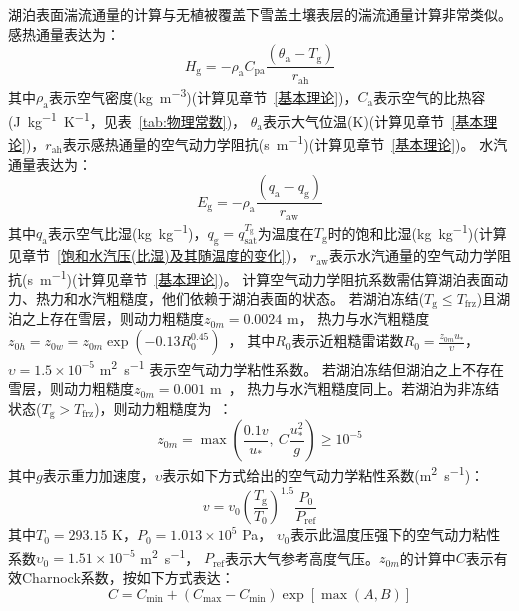 湖泊表面湍流通量的计算与无植被覆盖下雪盖土壤表层的湍流通量计算非常类似。感热通量表达为：
\begin{equation}
  H_{\mathrm{g}}=-\rho_{\mathrm{a}} C_{\mathrm{p a}} \frac{\left(\theta_{\mathrm{a}}-T_{\mathrm{g}}\right)}{r_{\mathrm{a h}}}
\end{equation}
其中$\rho_{\mathrm{a}}$表示空气密度(\unit{kg.m^{-3}})(计算见章节~\ref{基本理论})，$C_{\mathrm{a}}$表示空气的比热容(\unit{J.kg^{-1}.K^{-1}}，见表~\ref{tab:物理常数})，
$\theta_{\mathrm{a}}$表示大气位温(K)(计算见章节~\ref{基本理论})，$r_{\mathrm{ah}}$表示感热通量的空气动力学阻抗(\unit{s.m^{-1}})(计算见章节~\ref{基本理论})。
水汽通量表达为：
\begin{equation}
  E_{\mathrm{g}}=-\rho_{\mathrm{a}} \frac{\left(q_{\mathrm{a}}-q_{\mathrm{g}}\right)}{r_{\mathrm{a w}}}
\end{equation}
其中$q_{\mathrm{a}}$表示空气比湿(\unit{kg.kg^{-1}})，$q_{\mathrm {g}} =q_{\mathrm{sat}}^{T_{\mathrm {g}} }$为温度在$T_{\mathrm {g}} $时的饱和比湿(\unit{kg.kg^{-1}})(计算见章节~\ref{饱和水汽压(比湿)及其随温度的变化})，
$r_{\mathrm{aw}}$表示水汽通量的空气动力学阻抗(\unit{s.m^{-1}})(计算见章节~\ref{基本理论})。
计算空气动力学阻抗系数需估算湖泊表面动力、热力和水汽粗糙度，他们依赖于湖泊表面的状态。
若湖泊冻结($T_{\mathrm {g}} \leqslant T_{\mathrm {frz}} $)且湖泊之上存在雪层，则动力粗糙度$z_{0m}=0.0024$ m，
热力与水汽粗糙度$z_{0h}=z_{0w}=z_{0m}\exp{\left(-0.13R_0^{0.45}\right)}$~\citep{zilitinkevich1972dynamics}，
其中$R_0$表示近粗糙雷诺数$R_0=\frac{z_{0m}u_\ast}{\upsilon}$，
$\upsilon=1.5\times{10}^{-5}$ \unit{m^2.s^{-1}} 表示空气动力学粘性系数。
若湖泊冻结但湖泊之上不存在雪层，则动力粗糙度$z_{0m}=0.001$ m~\citep{subin2012improved}，
热力与水汽粗糙度同上。若湖泊为非冻结状态($T_{\mathrm {g}} >T_{\mathrm {frz}} $)，则动力粗糙度为~\citep{subin2012improved}：
\begin{equation}
  z_{0 m}=\max \left(\frac{0.1 v}{u_{*}},\ C \frac{u_{*}^{2}}{g}\right) \geqslant 10^{-5}
\end{equation}
其中$g$表示重力加速度，$\upsilon$表示如下方式给出的空气动力学粘性系数(\unit{m^2.s^{-1}})：
\begin{equation}
  v=v_{0}\left(\frac{T_{\mathrm{g}}}{T_{0}}\right)^{1.5} \frac{P_{0}}{P_{\mathrm{r e f}}}
\end{equation}
其中$T_0=293.15$ K，$P_0=1.013\times{10}^5$ Pa，
$\upsilon_0$表示此温度压强下的空气动力粘性系数$\upsilon_0=1.51\times{10}^{-5}$ \unit{m^2.s^{-1}}，
$P_{\mathrm{ref}}$表示大气参考高度气压。$z_{0m}$的计算中$C$表示有效Charnock系数，按如下方式表达：
\begin{equation}
  C=C_{\mathrm{min}}+\left(C_{\mathrm{max}}-C_{\mathrm{min}}\right) \exp\left[\max (A, B)\right]
\end{equation}
